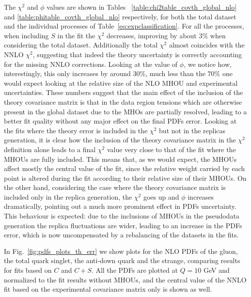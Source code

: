     The $\chi^2$ and $\phi$ values are shown in Tables ~\ref{table:chi2table_covth_global_nlo}
    and \ref{table:phitable_covth_global_nlo} respectively, for both the total dataset and the individual processes of 
    Table~\ref{eq:expclassification}.
    For all the processes, when including $S$ in the fit the $\chi^2$ decreases, improving
    by about $3\%$ when considering the total dataset. Additionally the total $\chi^2$ almost coincides with the NNLO 
    $\chi^2$, suggesting that indeed the theory uncertainty is correctly accounting for the missing NNLO corrections.
    Looking at the value of $\phi$, we notice how, interestingly, this only increases by around $30\%$, 
    much less than the $70\%$ one would expect looking at the relative size of the NLO MHOU and experimental uncertainties.
    These numbers suggest that the main effect of the inclusion of the theory covariance matrix is that
    in the data region tensions which are otherwise present in the global dataset due to the MHOs are partially resolved,
    leading to a better fit quality without any major effect on the final PDFs error. 
    Looking at the fits where the theory error is included in the $\chi^2$ but not in the replicas generation,
    it is clear how the inclusion of the theory covariance matrix in the 
    $\chi^2$ definition alone leads to a final $\chi^2$ value very close to that of the fit where the MHOUs are fully included.
    This means that, as we would expect, the MHOUs affect mostly the central value of the fit,
    since the relative weight carried by each point is altered during the fit according to their relative size of their MHOUs.
    On the other hand, considering the case where the theory covariance matrix is included only in the replica generation, 
    the $\chi^2$ goes up and $\phi$ increases dramatically, pointing out a much more prominent effect in PDFs uncertainty.
    This behaviour is expected: due to the inclusions of MHOUs in the pseudodata generation the replica fluctuations are wider,
    leading to an increase in the PDFs error, which is now uncompensated by a rebalancing of the datasets in the fits.
      
     
    In Fig.~\ref{fig:pdfs_plots_th_err} we show plots for the NLO PDFs of the gluon, the total quark singlet,
    the anti-down quark and the strange, comparing results for fits based on $C$ and $C+S$.
    All the PDFs are plotted at $Q=10$ GeV and normalized to the fit results without MHOUs, 
    and the central value of the NNLO fit based on the experimental covariance matrix only is shown as well.

